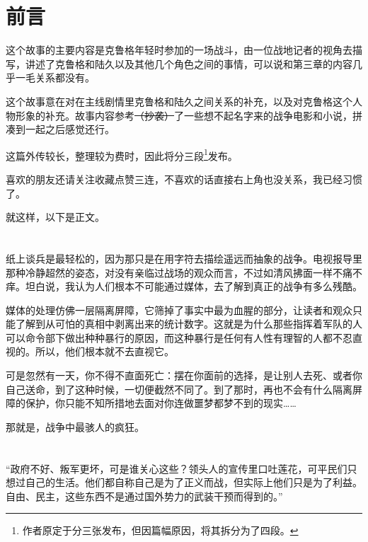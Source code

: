 

\section*{前言}
这个故事的主要内容是克鲁格年轻时参加的一场战斗，由一位战地记者的视角去描写，讲述了克鲁格和陆久以及其他几个角色之间的事情，可以说和第三章的内容几乎一毛关系都没有。

这个故事意在对在主线剧情里克鲁格和陆久之间关系的补充，以及对克鲁格这个人物形象的补充。故事内容参考\sout{（抄袭）}了一些想不起名字来的战争电影和小说，拼凑到一起之后感觉还行。

这篇外传较长，整理较为费时，因此将分三段\footnote{作者原定于分三张发布，但因篇幅原因，将其拆分为了四段。}发布。

喜欢的朋友还请关注收藏点赞三连，不喜欢的话直接右上角也没关系，我已经习惯了。

就这样，以下是正文。

\lineseparator

\section*{}

\begin{QuoteEnv}{}
纸上谈兵是最轻松的，因为那只是在用字符去描绘遥远而抽象的战争。电视报导里那种冷静超然的姿态，对没有亲临过战场的观众而言，不过如清风拂面一样不痛不痒。坦白说，我认为人们根本不可能通过媒体，去了解到真正的战争有多么残酷。

媒体的处理仿佛一层隔离屏障，它筛掉了事实中最为血腥的部分，让读者和观众只能了解到从可怕的真相中剥离出来的统计数字。这就是为什么那些指挥着军队的人可以命令部下做出种种暴行的原因，而这种暴行是任何有人性有理智的人都不忍直视的。所以，他们根本就不去直视它。

可是忽然有一天，你不得不直面死亡：摆在你面前的选择，是让别人去死、或者你自己送命，到了这种时候，一切便截然不同了。到了那时，再也不会有什么隔离屏障的保护，你只能不知所措地去面对你连做噩梦都梦不到的现实……

那就是，战争中最骇人的疯狂。
\end{QuoteEnv}

\section*{}
“政府不好、叛军更坏，可是谁关心这些？领头人的宣传里口吐莲花，可平民们只想过自己的生活。他们都自称自己是为了正义而战，但实际上他们只是为了利益。自由、民主，这些东西不是通过国外势力的武装干预而得到的。”

